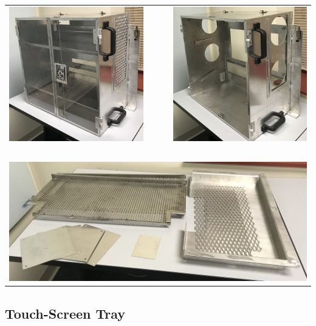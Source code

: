 \begin{tabular}{ccc}
\includegraphics[width=0.4\columnwidth]
{photos/install-20181106/bay-before.jpg} &
~~~ &
\includegraphics[width=0.4\columnwidth]
{photos/install-20181106/bay-stripped.jpg} \\
 & ~ & \\
\multicolumn{3}{c}{%
\includegraphics[width=0.85\columnwidth]
{photos/install-20181106/bay-parts.jpg}%
} \\
\end{tabular}

%
%
\clearpage
\subsection{Touch-Screen Tray}
\label{sect-setup-howto-touch}

